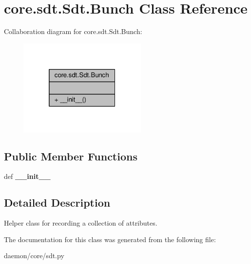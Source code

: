 \hypertarget{classcore_1_1sdt_1_1_sdt_1_1_bunch}{\section{core.\+sdt.\+Sdt.\+Bunch Class Reference}
\label{classcore_1_1sdt_1_1_sdt_1_1_bunch}
}


Collaboration diagram for core.\+sdt.\+Sdt.\+Bunch\+:
\nopagebreak
\begin{figure}[H]
\begin{center}
\leavevmode
\includegraphics[width=181pt]{classcore_1_1sdt_1_1_sdt_1_1_bunch__coll__graph}
\end{center}
\end{figure}
\subsection*{Public Member Functions}
\begin{DoxyCompactItemize}
\item 
\hypertarget{classcore_1_1sdt_1_1_sdt_1_1_bunch_a7f605fab1cb780eefa73a7eae4016844}{def {\bfseries \+\_\+\+\_\+init\+\_\+\+\_\+}}\label{classcore_1_1sdt_1_1_sdt_1_1_bunch_a7f605fab1cb780eefa73a7eae4016844}

\end{DoxyCompactItemize}


\subsection{Detailed Description}
\begin{DoxyVerb}Helper class for recording a collection of attributes.
\end{DoxyVerb}
 

The documentation for this class was generated from the following file\+:\begin{DoxyCompactItemize}
\item 
daemon/core/sdt.\+py\end{DoxyCompactItemize}
